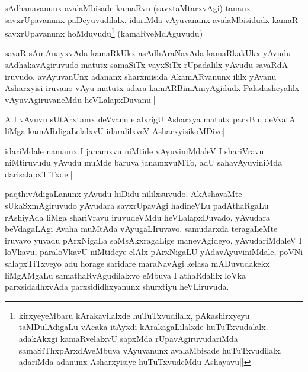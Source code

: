 
\begin{artha}
sAdhanavanunx avalaMbisade kamaRvu (savxtaMtarxvAgi) tananx savxrUpavanunx paDeyuvudilalx. idariMda vAyuvanunx avalaMbisidudx kamaR savxrUpavanunx hoMduvudu\footnote[2]{kirxyeyeMbaru kArakavilalxde huTuTxvudilalx, pAkashirxyeyu taMDulAdigaLu vAcaka itAyxdi kArakagaLilalxde huTuTxvudalalx. adakAkxgi kamaRvelalxvU sapxMda rUpavAgiruvudariMda samaSiThxpArxdAveMbuva vAyuvanunx avalaMbisade huTuTxvudilalx. adariMda adanunx Asharxyisiye huTuTxvudeMdu Ashayavu||} (kamaRveMdAguvudu)
\end{artha}


\begin{artha}
\stext savaR sAmAnayxvAda kamaRkUkx asAdhAraNavAda kamaRkakUkx yAvudu sAdhakavAgiruvudo matutx samaSiTx vayxSiTx rUpadalilx yAvudu savaRdA iruvudo. avAyuvanUnx adananx sharxmisida AkamARvanunx ililx yAvanu Asharxyisi iruvano vAyu matutx adara kamARBimAniyAgidudx Paladasheyalilx vAyuvAgiruvaneMdu heVLalapxDuvanu||
\end{artha}


\begin{artha}
A I vAyuvu sUtArxtamx deVvanu elalxrigU Asharxya matutx parxBu, deVvatA liMga kamARdigaLelalxvU idaralilxveV AsharxyisikoMDive||
\end{artha}


\begin{artha}
idariMdale namamx I janamxvu niMtide vAyuviniMdaleV I shariVravu niMtiruvudu yAvudu muMde baruva janamxvuMTo, adU sahavAyuviniMda darisalapxTiTxde||
\end{artha}

\begin{artha}%
paqthivAdigaLanunx yAvudu hiDidu nililxsuvudo. AkAshavaMte sUkaSxmAgiruvudo yAvudara savxrUpavAgi hadineVLu padAthaRgaLu rAshiyAda liMga shariVravu iruvudeVMdu heVLalapxDuvado, yAvudara beVdagaLAgi Avaha muMtAda vAyugaLIruvavo. samudarxda teragaLeMte iruvavo yuvadu pArxNigaLa saMsAkxragaLige maneyAgideyo, yAvudariMdaleV I loVkavu, paraloVkavU niMtideye elAlx pArxNigaLU yAdavAyuviniMdale, poVNi salapxTiTxveyo adu horage saridare maraNavAgi kelasa mADuvudakekx liMgAMgaLu samathaRvAgudilalxvo eMbuva I athaRdalilx loVka parxsidadhxvAda parxsididhxyanunx shurxtiyu heVLiruvuda. 
\end{artha}

